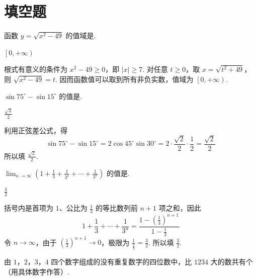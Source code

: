 \section{填空题}

\begin{problem}
函数 \(y=\sqrt{x^2-49}\) 的值域是\fillinblank{}.
\end{problem}

\begin{answer}
\(\left[0,+\infty\right)\)
\end{answer}

\begin{solution}
根式有意义的条件为 \(x^2-49\geqslant0\)，即 \(\lvert x\rvert\geqslant7\). 对任意 \(t\geqslant0\)，取 \(x=\sqrt{t^2+49}\)，则 \(\sqrt{x^2-49}=t\). 因而函数值可以取到所有非负实数，值域为 \(\left[0,+\infty\right)\).
\end{solution}

\begin{problem}
\(\sin 75^\circ-\sin 15^\circ\) 的值是\fillinblank{}.
\end{problem}

\begin{answer}
\(\frac{\sqrt{2}}{2}\)
\end{answer}

\begin{solution}
利用正弦差公式，得
\[
\sin75^\circ-\sin15^\circ
=2\cos45^\circ\sin30^\circ
=2\cdot\frac{\sqrt2}{2}\cdot\frac12
=\frac{\sqrt2}{2}
\]
所以填 \(\frac{\sqrt2}{2}\).
\end{solution}

\begin{problem}
\(\displaystyle\lim_{n\to\infty}\left( 1+\frac{1}{3}+\frac{1}{3^2}+\cdots+\frac{1}{3^n} \right)\) 的值是\fillinblank{}.
\end{problem}

\begin{answer}
\(\frac{3}{2}\)
\end{answer}

\begin{solution}
括号内是首项为 \(1\)、公比为 \(\frac13\) 的等比数列前 \(n+1\) 项之和，因此
\[
1+\frac13+\cdots+\frac1{3^n}
=\frac{1-(\frac{1}{3})^{n+1}}{1-\frac{1}{3}}
\]
令 \(n\to\infty\)，由于 \(\left(\frac13\right)^{n+1}\to0\)，极限为 \(\frac{1}{\frac{2}{3}}=\frac32\). 所以填 \(\frac32\).
\end{solution}

\begin{problem}
由 \(1\)，\(2\)，\(3\)，\(4\) 四个数字组成的没有重复数字的四位数中，比 \(1234\) 大的数共有\fillinblank{}个（用具体数字作答）.
\end{problem}

